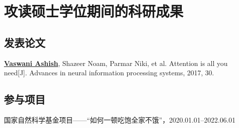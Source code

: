 \chapter{攻读硕士学位期间的科研成果}

\section*{发表论文}

\begin{enumerate}[label={[\arabic*]}]
    \item \underline{\textbf{Vaswani Ashish}}, Shazeer Noam, Parmar Niki, et al. Attention is all you need[J]. Advances in neural information processing systems, 2017, 30.
  \end{enumerate}



\section*{参与项目}

\begin{enumerate}[label={[\arabic*]}]
  \item 国家自然科学基金项目——“如何一顿吃饱全家不饿”，2020.01.01--2022.06.01

\end{enumerate}


